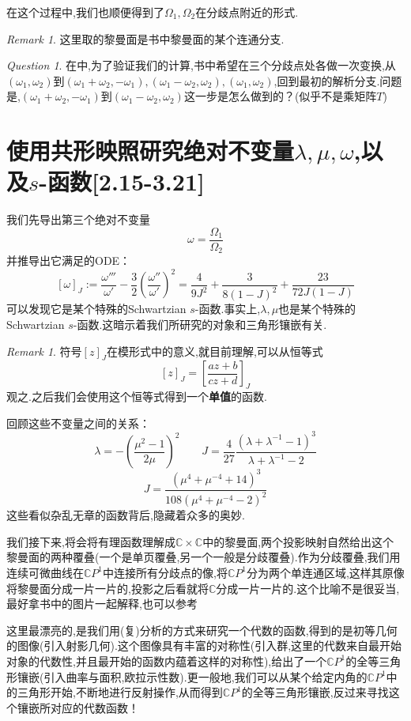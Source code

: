 \documentclass[12pt,A4paper,oneside]{amsart}
\numberwithin{equation}{section}
\theoremstyle{plain}
\theoremstyle{plain}
\theoremstyle{plain}
\numberwithin{equation}{section}
\theoremstyle{remark}
\newtheorem{remark}[theorem]{Remark}
\newtheorem{question}[theorem]{Question}
\begin{document}
在这个过程中,我们也顺便得到了$\Omega_1,\Omega_2$在分歧点附近的形式.
\begin{remark}
	这里取的黎曼面是书中黎曼面的某个连通分支.
\end{remark}
\begin{question}
	在\cite[Part I,2.14]{klein1892vorlesungen}中,为了验证我们的计算,书中希望在三个分歧点处各做一次变换,从$(\omega_1,\omega_2)$到$(\omega_1+\omega_2,-\omega_1),(\omega_1-\omega_2,\omega_2),(\omega_1,\omega_2)$,回到最初的解析分支.问题是,$(\omega_1+\omega_2,-\omega_1)$到$(\omega_1-\omega_2,\omega_2)$这一步是怎么做到的？(似乎不是乘矩阵$T$)
\end{question}
\section{使用共形映照研究绝对不变量$\lambda,\mu,\omega$,以及$s$-函数[2.15-3.21]}
我们先导出第三个绝对不变量
$$\omega=\frac{\Omega_1}{\Omega_2}$$
并推导出它满足的ODE：
$$[\omega]_{J}:=\frac{\omega'''}{\omega'}-\frac{3}{2}\left(\frac{\omega''}{\omega'}\right)^2=\frac{4}{9J^2}+\frac{3}{8(1-J)^2}+\frac{23}{72J(1-J)}$$
可以发现它是某个特殊的Schwartzian $s$-函数.事实上,$\lambda,\mu$也是某个特殊的Schwartzian $s$-函数.这暗示着我们所研究的对象和三角形镶嵌有关.
\begin{remark}
	符号$[z]_{J}$在模形式中的意义,就目前理解,可以从恒等式
	$$[z]_{J}=\left[\frac{az+b}{cz+d}\right]_{J}$$
	观之.之后我们会使用这个恒等式得到一个\textbf{单值}的函数.
\end{remark}
回顾这些不变量之间的关系：
$$\lambda=-\left(\frac{\mu^2-1}{2\mu}\right)^2 \qquad J=\frac{4}{27}\frac{(\lambda+\lambda^{-1}-1)^3}{\lambda+\lambda^{-1}-2}$$
$$J=\frac{(\mu^4+\mu^{-4}+14)^3}{108(\mu^4+\mu^{-4}-2)^2}$$
这些看似杂乱无章的函数背后,隐藏着众多的奥妙.

我们接下来,将会将有理函数理解成$\mathbb{C} \times \mathbb{C}$中的黎曼面,两个投影映射自然给出这个黎曼面的两种覆叠(一个是单页覆叠,另一个一般是分歧覆叠).作为分歧覆叠,我们用连续可微曲线在$\mathbb{C}P^1$中连接所有分歧点的像,将$\mathbb{C}P^1$分为两个单连通区域,这样其原像将黎曼面分成一片一片的,投影之后看就将$\mathbb{C}$分成一片一片的.这个比喻不是很妥当,最好拿书中的图片一起解释,也可以参考\cite[p99,FIG.3-11.]{ahlfors1979complex}

这里最漂亮的,是我们用(复)分析的方式来研究一个代数的函数,得到的是初等几何的图像(引入射影几何).这个图像具有丰富的对称性(引入群,这里的代数来自最开始对象的代数性,并且最开始的函数内蕴着这样的对称性),给出了一个$\mathbb{C}P^1$的全等三角形镶嵌(引入曲率与面积,欧拉示性数).更一般地,我们可以从某个给定内角的$\mathbb{C}P^1$中的三角形开始,不断地进行反射操作,从而得到$\mathbb{C}P^1$的全等三角形镶嵌,反过来寻找这个镶嵌所对应的代数函数！
\end{document}

